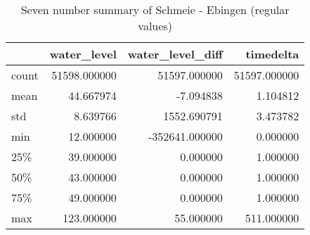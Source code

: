 \begin{table}[htp]
\centering
\caption{Seven number summary of Schmeie - Ebingen (regular values)}
\label{table:auto-1003803-7-number-summary-regular}
\begin{tabular}{lrrr}
\toprule
{} &   water\_level &  water\_level\_diff &     timedelta \\
\midrule
count &  51598.000000 &      51597.000000 &  51597.000000 \\
mean  &     44.667974 &         -7.094838 &      1.104812 \\
std   &      8.639766 &       1552.690791 &      3.473782 \\
min   &     12.000000 &    -352641.000000 &      0.000000 \\
25\%   &     39.000000 &          0.000000 &      1.000000 \\
50\%   &     43.000000 &          0.000000 &      1.000000 \\
75\%   &     49.000000 &          0.000000 &      1.000000 \\
max   &    123.000000 &         55.000000 &    511.000000 \\
\bottomrule
\end{tabular}
\end{table}
